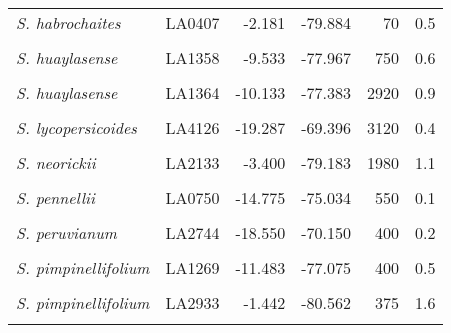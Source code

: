 \documentclass[
  letterpaper,
  DIV=11,
  numbers=noendperiod]{scrartcl}
\begin{document}
\begin{longtable}{>{\raggedright\arraybackslash}p{3.25cm}lrrrr}
\em{S. habrochaites} & LA0407 & -2.181 & -79.884 & 70 & 0.5\\
\em{\cellcolor{gray!10}{S. habrochaites}} & \cellcolor{gray!10}{LA1777} & \cellcolor{gray!10}{-9.550} & \cellcolor{gray!10}{-77.700} & \cellcolor{gray!10}{3216} & \cellcolor{gray!10}{0.4}\\
\em{S. huaylasense} & LA1358 & -9.533 & -77.967 & 750 & 0.6\\
\em{\cellcolor{gray!10}{S. huaylasense}} & \cellcolor{gray!10}{LA1360} & \cellcolor{gray!10}{-9.546} & \cellcolor{gray!10}{-77.929} & \cellcolor{gray!10}{1490} & \cellcolor{gray!10}{0.5}\\
\addlinespace
\em{S. huaylasense} & LA1364 & -10.133 & -77.383 & 2920 & 0.9\\
\em{\cellcolor{gray!10}{S. lycopersicoides}} & \cellcolor{gray!10}{LA2951} & \cellcolor{gray!10}{-19.317} & \cellcolor{gray!10}{-69.450} & \cellcolor{gray!10}{2200} & \cellcolor{gray!10}{0.5}\\
\em{S. lycopersicoides} & LA4126 & -19.287 & -69.396 & 3120 & 0.4\\
\em{\cellcolor{gray!10}{S. neorickii}} & \cellcolor{gray!10}{LA1322} & \cellcolor{gray!10}{-13.483} & \cellcolor{gray!10}{-72.442} & \cellcolor{gray!10}{2380} & \cellcolor{gray!10}{0.7}\\
\em{S. neorickii} & LA2133 & -3.400 & -79.183 & 1980 & 1.1\\
\addlinespace
\em{\cellcolor{gray!10}{S. pennellii}} & \cellcolor{gray!10}{LA0716} & \cellcolor{gray!10}{-16.225} & \cellcolor{gray!10}{-73.617} & \cellcolor{gray!10}{50} & \cellcolor{gray!10}{0.2}\\
\em{S. pennellii} & LA0750 & -14.775 & -75.034 & 550 & 0.1\\
\em{\cellcolor{gray!10}{S. pennellii}} & \cellcolor{gray!10}{LA3778} & \cellcolor{gray!10}{-14.775} & \cellcolor{gray!10}{-75.034} & \cellcolor{gray!10}{616} & \cellcolor{gray!10}{0.1}\\
\em{S. peruvianum} & LA2744 & -18.550 & -70.150 & 400 & 0.2\\
\em{\cellcolor{gray!10}{S. peruvianum}} & \cellcolor{gray!10}{LA2964} & \cellcolor{gray!10}{-18.028} & \cellcolor{gray!10}{-70.835} & \cellcolor{gray!10}{75} & \cellcolor{gray!10}{1.2}\\
\addlinespace
\em{S. pimpinellifolium} & LA1269 & -11.483 & -77.075 & 400 & 0.5\\
\em{\cellcolor{gray!10}{S. pimpinellifolium}} & \cellcolor{gray!10}{LA1589} & \cellcolor{gray!10}{-8.433} & \cellcolor{gray!10}{-78.817} & \cellcolor{gray!10}{30} & \cellcolor{gray!10}{0.1}\\
\em{S. pimpinellifolium} & LA2933 & -1.442 & -80.562 & 375 & 1.6\\
\em{\cellcolor{gray!10}{S. sitiens}} & \cellcolor{gray!10}{LA4116} & \cellcolor{gray!10}{-22.159} & \cellcolor{gray!10}{-68.782} & \cellcolor{gray!10}{2960} & \cellcolor{gray!10}{0.1}\\
\bottomrule

\end{longtable}
\end{document}
